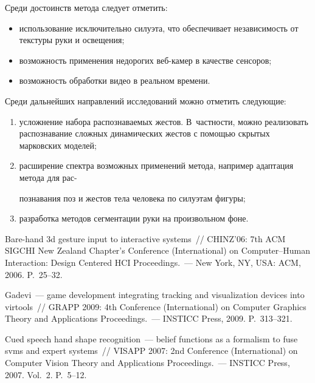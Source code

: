 \begin{multicols}{2}
Среди достоинств метода следует отметить:
\begin{itemize}
\item использование исключительно силуэта, что 
обеспечивает независимость от текстуры руки и освещения;
\item возможность применения недорогих веб-ка\-мер в качестве сенсоров;
\item возможность обработки видео в реальном времени.
\end{itemize}

Среди дальнейших направлений исследований можно отметить следующие:
\begin{enumerate}[(1)]
\item  усложнение набора распознаваемых жес\-тов.
В~част\-ности, мож\-но реализовать распознавание слож\-ных 
динамических жес\-тов с помощью скрытых марковских моделей;
\item расширение спектра возможных применений метода, 
например адаптация метода для рас-\linebreak\vspace*{-12pt}
\columnbreak

\noindent
познавания поз и жестов тела человека по силуэтам фигуры;
\item разработка методов сегментации руки на произвольном фоне.
\end{enumerate}

{\small\frenchspacing
{%
\begin{thebibliography}{99}

Bare-hand 3d gesture
  input to interactive systems~// CHINZ'06: 7th ACM SIGCHI
  New Zealand Chapter's  Conference (International) on Computer--Human Interaction:
  Design Centered HCI Proceedings.~---
New York, NY, USA: ACM, 2006.
P.~25--32.

 Gadevi~--- game
  development integrating tracking and visualization devices into virtools~//
  GRAPP 2009:  4th Conference (International) on Computer
  Graphics Theory and Applications Proceedings.~---
INSTICC Press, 2009. P.~313--321.

  Cued speech hand shape recognition~--- belief functions as a
  formalism to fuse svms and expert systems~// VISAPP 2007: 
2nd Conference (International) on Computer Vision Theory and Applications
  Proceedings.~---
INSTICC Press, 2007.  Vol.~2. P.~5--12.


\end{thebibliography}}}
\end{multicols}
